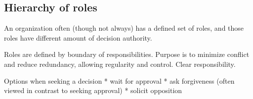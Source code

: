 \subsection{Hierarchy of roles}

An \gls{organization} often (though not always) has a defined set of roles, and those roles have different amount of decision authority. 

Roles are defined by boundary of responsibilities. Purpose is to minimize conflict and reduce redundancy, allowing regularity and control. Clear responsibility. 

Options when seeking a decision
* wait for approval
* ask forgiveness (often viewed in contrast to seeking approval)
* solicit opposition
